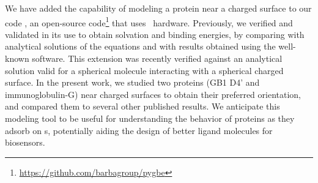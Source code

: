 We have added the capability of modeling a protein near a charged surface to our code \pygbe , an open-source code\footnote{\url{https://github.com/barbagroup/pygbe}}  that uses \gpu\ hardware.  Previously, we verified and validated \pygbe in its use to obtain solvation and binding energies, by comparing with analytical solutions of the equations and with results obtained using the well-known \apbs software.\cite{CooperBarba-share154331,CooperBardhanBarba2013} 
This extension was recently verified against an analytical solution valid for a spherical molecule interacting with a spherical charged surface.\cite{CooperBarba2015a}
In the present work, we studied two proteins (GB1 D4' and immunoglobulin-G) near charged surfaces to obtain their preferred orientation, and compared them to several other published results.
We anticipate this modeling tool to be useful for understanding the behavior of proteins as they adsorb on \sam s, potentially aiding the design of better ligand molecules for biosensors.

